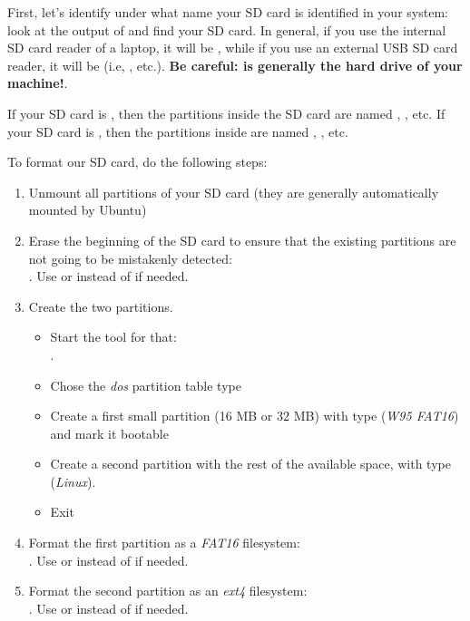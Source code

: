 First, let's identify under what name your SD card is identified in
your system: look at the output of  and
find your SD card. In general, if you use the internal SD card reader
of a laptop, it will be , while if you use an external
USB SD card reader, it will be  (i.e, ,
etc.). {\bf Be careful:  is generally the hard drive of
  your machine!}.

If your SD card is , then the partitions inside the
SD card are named , , etc. If your SD
card is , then the partitions inside are named
, , etc.

To format our SD card, do the following steps:

\begin{enumerate}

\item Unmount all partitions of your SD card (they are generally
  automatically mounted by Ubuntu)

\item Erase the beginning of the SD card to ensure that the existing
  partitions are not going to be mistakenly detected:\\
  . Use
   or  instead of  if needed.

\item Create the two partitions.

  \begin{itemize}

  \item Start the  tool for that:\\
    .

  \item Chose the {\em dos} partition table type

  \item Create a first small partition (16 MB or 32 MB) with type 
    ({\em W95 FAT16}) and mark it bootable

  \item Create a second partition with the rest of the available space,
    with type  ({\em Linux}).

  \item Exit 

  \end{itemize}

\item Format the first partition as a {\em FAT16} filesystem:\\
  . Use 
  or  instead of  if needed.

\item Format the second partition as an {\em ext4} filesystem:\\
  . Use
   or  instead of  if needed.

\end{enumerate}

